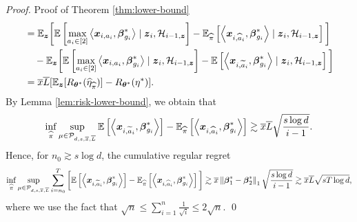\begin{proof}{Proof of Theorem \ref{thm:lower-bound}}
\begin{align*}
	&=\mathbb{E}_{\boldsymbol{z}}\bigg[\mathbb{E}\left[\max_{a_i \in [2]}\left\langle \boldsymbol{x}_{i,a_i}, \boldsymbol{\beta}^*_{g_i} \right\rangle \mid \boldsymbol{z}_i,  {\cal H}_{i-1, \boldsymbol{z}}\right] - \mathbb{E}_{\widehat\pi}\left[\left\langle \boldsymbol{x}_{i,\widehat{a}_i}, \boldsymbol{\beta}^*_{g_i} \right\rangle \mid  \boldsymbol{z}_i,  {\cal H}_{i-1, \boldsymbol{z}}\right]\bigg]\\
	&\quad  - \mathbb{E}_{\boldsymbol{z}}\bigg[\mathbb{E}\left[\max_{a_i \in [2]}\left\langle \boldsymbol{x}_{i,a_i}, \boldsymbol{\beta}^*_{g_i} \right\rangle \mid   \boldsymbol{z}_i, {\cal H}_{i-1,\boldsymbol{z}}\right] - \mathbb{E}\left[\left\langle \boldsymbol{x}_{i,\widetilde{a}_i}, \boldsymbol{\beta}^*_{g_i} \right\rangle \mid \boldsymbol{z}_i, {\cal H}_{i-1,\boldsymbol{z}} \right] \bigg]\\
	&=\overline{x}\overline{L}[\mathbb{E}_{\boldsymbol{z}}[R_{\boldsymbol{\theta}^*}(\widehat\eta_{\widehat\pi})]-R_{\boldsymbol{\theta}^*}(\eta^*)].
\end{align*}
By Lemma \ref{lem:risk-lower-bound}, we obtain that
\[ \inf_{\widehat\pi}\sup_{\mu \in {\cal P}_{d,s,\overline{x},\overline{L}}}\mathbb{E} \left[\left\langle \boldsymbol{x}_{i, \widetilde{a}_i}, \boldsymbol{\beta}^*_{g_i} \right\rangle\right] - \mathbb{E}_{\widehat\pi} \left[\left\langle \boldsymbol{x}_{i, \widehat{a}_i}, \boldsymbol{\beta}^*_{g_i} \right\rangle\right] \gtrsim \overline{x}\overline{L}\sqrt{\frac{s\log d}{i-1}}.\]
Hence, for $n_0\gtrsim s\log d$, the cumulative regular regret 
\[ \inf_{\widehat\pi}\sup_{\mu \in {\cal P}_{d,s,\overline{x},\overline{L}}}\sum_{i=n_0}^{T}\bigg[\mathbb{E} \left[\left\langle \boldsymbol{x}_{i, \widetilde{a}_i}, \boldsymbol{\beta}^*_{g_i} \right\rangle\right] - \mathbb{E}_{\widehat\pi} \left[\left\langle \boldsymbol{x}_{i, \widehat{a}_i}, \boldsymbol{\beta}^*_{g_i} \right\rangle\right]\bigg] \gtrsim \overline{x}\left\lVert\boldsymbol{\beta}_1^*-\boldsymbol{\beta}_2^*\right\rVert_1\sqrt{\frac{s\log d}{i-1}}\gtrsim \overline{x}\overline{L}\sqrt{sT\log d},\]
where we use the fact that $\sqrt{n}\leq \sum_{i=1}^{n}\frac{1}{\sqrt{i}} \leq 2\sqrt{n}$. \hfill\qed
\end{proof}

